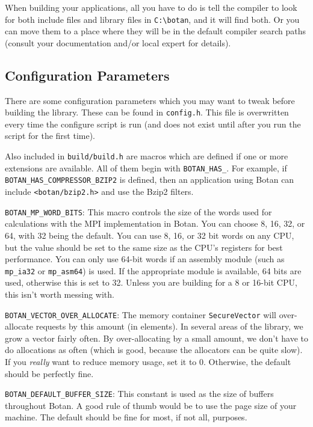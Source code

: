 \documentclass{article}
\newcommand{\filename}[1]{\texttt{#1}}
\newcommand{\module}[1]{\texttt{#1}}
\newcommand{\type}[1]{\texttt{#1}}
\newcommand{\macro}[1]{\texttt{#1}}
\begin{document}
When building your applications, all you have to do is tell the
compiler to look for both include files and library files in
\verb|C:\botan|, and it will find both. Or you can move them to a
place where they will be in the default compiler search paths (consult
your documentation and/or local expert for details).

\subsection{Configuration Parameters}

There are some configuration parameters which you may want to tweak
before building the library. These can be found in
\filename{config.h}. This file is overwritten every time the configure
script is run (and does not exist until after you run the script for
the first time).

Also included in \filename{build/build.h} are macros which are defined
if one or more extensions are available. All of them begin with
\verb|BOTAN_HAS_|. For example, if \verb|BOTAN_HAS_COMPRESSOR_BZIP2|
is defined, then an application using Botan can include
\filename{<botan/bzip2.h>} and use the Bzip2 filters.

\macro{BOTAN\_MP\_WORD\_BITS}: This macro controls the size of the
words used for calculations with the MPI implementation in Botan. You
can choose 8, 16, 32, or 64, with 32 being the default. You can use 8,
16, or 32 bit words on any CPU, but the value should be set to the
same size as the CPU's registers for best performance. You can only
use 64-bit words if an assembly module (such as \module{mp\_ia32} or
\module{mp\_asm64}) is used. If the appropriate module is available,
64 bits are used, otherwise this is set to 32. Unless you are building
for a 8 or 16-bit CPU, this isn't worth messing with.

\macro{BOTAN\_VECTOR\_OVER\_ALLOCATE}: The memory container
\type{SecureVector} will over-allocate requests by this amount (in
elements). In several areas of the library, we grow a vector fairly often. By
over-allocating by a small amount, we don't have to do allocations as often
(which is good, because the allocators can be quite slow). If you \emph{really}
want to reduce memory usage, set it to 0. Otherwise, the default should be
perfectly fine.

\macro{BOTAN\_DEFAULT\_BUFFER\_SIZE}: This constant is used as the size of
buffers throughout Botan. A good rule of thumb would be to use the page size of
your machine. The default should be fine for most, if not all, purposes.
\end{document}
